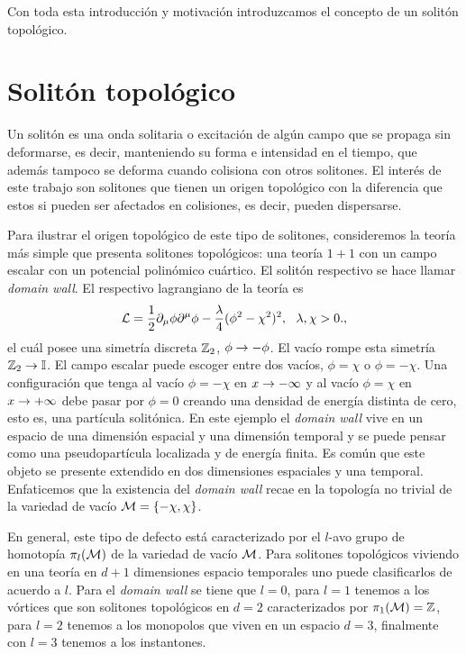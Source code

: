 Con toda esta introducción y motivación introduzcamos el concepto de un solitón topológico.

\section{Solitón topológico}

Un solitón es una onda solitaria o excitación de algún campo que se propaga sin deformarse, es decir, manteniendo su forma e intensidad en el tiempo, que además tampoco se deforma cuando colisiona con otros solitones. El interés de este trabajo son solitones que tienen un origen topológico con la diferencia que estos si pueden ser afectados en colisiones, es decir, pueden dispersarse.

Para ilustrar el origen topológico de este tipo de solitones, consideremos la teoría más simple que presenta solitones topológicos: una teoría $1+1$ con un campo escalar con un potencial polinómico cuártico. El solitón respectivo se hace llamar \emph{domain wall}. El respectivo lagrangiano de la teoría es
\begin{align}
	\mc L = \f 12\pr_\mu\phi\pr^\mu\phi-\f{\lambda}4(\phi^2-\chi^2)^2, \ \ \lambda,\chi>0.,
\end{align}
el cuál posee una simetría discreta $\mathbb{Z}_2$, $\phi\rightarrow-\phi$. El vacío rompe esta simetría $\mathbb{Z}_2\rightarrow\mathbb{I}$. El campo escalar puede escoger entre dos vacíos, $\phi=\chi$ o $\phi=-\chi$. Una configuración que tenga al vacío $\phi=-\chi$ en $x\rightarrow-\infty$ y al vacío $\phi=\chi$ en $x\rightarrow+\infty$ debe pasar por $\phi=0$ creando una densidad de energía distinta de cero, esto es, una partícula solitónica. En este ejemplo el \emph{domain wall} vive en un espacio de una dimensión espacial y una dimensión temporal y se puede pensar como una pseudopartícula localizada y de energía finita. Es común que este objeto se presente extendido en dos dimensiones espaciales y una temporal. Enfaticemos que la existencia del \emph{domain wall} recae en la topología no trivial de la variedad de vacío $\mathcal{M}=\{-\chi,\chi\}$.

En general, este tipo de defecto está caracterizado por el $l$-avo grupo de homotopía $\pi_l(\mathcal{M})$ de la variedad de vacío $\mathcal{M}$. Para solitones topológicos viviendo en una teoría en $d+1$ dimensiones espacio temporales uno puede clasificarlos de acuerdo a $l$. Para el \emph{domain wall} se tiene que $l=0$, para $l=1$ tenemos a los vórtices que son solitones topológicos en $d=2$ caracterizados por $\pi_1(\mathcal{M})=\mathbb{Z}$, para $l=2$ tenemos a los monopolos que viven en un espacio $d=3$, finalmente con $l=3$ tenemos a los instantones.


